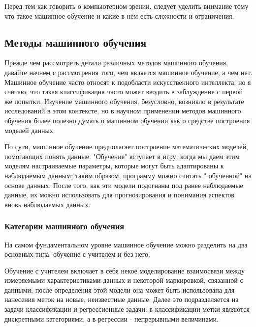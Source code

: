 Перед тем как говорить о компьютерном зрении, следует уделить внимание тому что такое машинное обучение и какие в нём есть сложности и ограничения.

%


\subsection{Методы машинного обучения}
Прежде чем рассмотреть детали различных методов машинного обучения, давайте начнем с рассмотрения того, чем является машинное обучение, а чем нет. Машинное обучение часто относят к подобласти искусственного интеллекта, но я считаю, что такая классификация часто может вводить в заблуждение с первой же попытки. Изучение машинного обучения, безусловно, возникло в результате исследований в этом контексте, но в научном применении методов машинного обучения более полезно думать о машинном обучении как о средстве построения моделей данных.

По сути, машинное обучение предполагает построение математических моделей, помогающих понять данные. "Обучение" вступает в игру, когда мы даем этим моделям настраиваемые параметры, которые могут быть адаптированы к наблюдаемым данным; таким образом, программу можно считать " обученной" на основе данных. После того, как эти модели подогнаны под ранее наблюдаемые данные, их можно использовать для прогнозирования и понимания аспектов вновь наблюдаемых данных.

\subsubsection{Категории машинного обучения}
На самом фундаментальном уровне машинное обучение можно разделить на два основных типа: обучение с учителем и без него.


Обучение с учителем включает в себя некое моделирование взаимосвязи между измеряемыми характеристиками данных и некоторой маркировкой, связанной с данными; после определения этой модели она может быть использована для нанесения меток на новые, неизвестные данные. Далее это подразделяется на задачи классификации и регрессионные задачи: в классификации метки являются дискретными категориями, а в регрессии - непрерывными величинами. 


